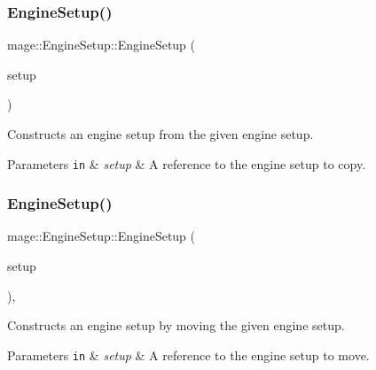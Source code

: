 \subsubsection{\texorpdfstring{Engine\+Setup()}{EngineSetup()}\hspace{0.1cm}{\footnotesize\ttfamily [2/3]}}
{\footnotesize\ttfamily mage\+::\+Engine\+Setup\+::\+Engine\+Setup (\begin{DoxyParamCaption}\item[{const \hyperlink{classmage_1_1_engine_setup}{Engine\+Setup} \&}]{setup }\end{DoxyParamCaption})\hspace{0.3cm}{\ttfamily [default]}}

Constructs an engine setup from the given engine setup.


\begin{DoxyParams}[1]{Parameters}
\mbox{\tt in}  & {\em setup} & A reference to the engine setup to copy. \\
\hline
\end{DoxyParams}
\hypertarget{classmage_1_1_engine_setup_a22b87954ad7a2bc26ff7f26fb443c58c}{}\label{classmage_1_1_engine_setup_a22b87954ad7a2bc26ff7f26fb443c58c} 
\subsubsection{\texorpdfstring{Engine\+Setup()}{EngineSetup()}\hspace{0.1cm}{\footnotesize\ttfamily [3/3]}}
{\footnotesize\ttfamily mage\+::\+Engine\+Setup\+::\+Engine\+Setup (\begin{DoxyParamCaption}\item[{\hyperlink{classmage_1_1_engine_setup}{Engine\+Setup} \&\&}]{setup }\end{DoxyParamCaption})\hspace{0.3cm}{\ttfamily [default]}, {\ttfamily [noexcept]}}

Constructs an engine setup by moving the given engine setup.


\begin{DoxyParams}[1]{Parameters}
\mbox{\tt in}  & {\em setup} & A reference to the engine setup to move. \\
\hline
\end{DoxyParams}
\hypertarget{classmage_1_1_engine_setup_a0480bee101756b72233a1aa7d44eb185}{}\label{classmage_1_1_engine_setup_a0480bee101756b72233a1aa7d44eb185} 
